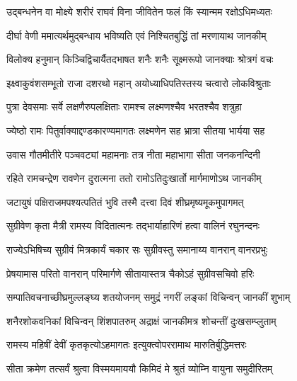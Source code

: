 
\notes{}
\textlink{}
\translink{}

\storymeta


\twolineshloka
{उद्बन्धनेन वा मोक्ष्ये शरीरं राघवं विना}
{जीवितेन फलं किं स्यान्मम रक्षोऽधिमध्यतः} %

\twolineshloka
{दीर्घा वेणी ममात्यर्थमुद्बन्धाय भविष्यति}
{एवं निश्चितबुद्धिं तां मरणायाथ जानकीम्} %

\twolineshloka
{विलोक्य हनुमान् किञ्चिद्विचार्यैतदभाषत}
{शनैः शनैः सूक्ष्मरूपो जानक्याः श्रोत्रगं वचः} %

\twolineshloka
{इक्ष्वाकुवंशसम्भूतो राजा दशरथो महान्}
{अयोध्याधिपतिस्तस्य चत्वारो लोकविश्रुताः} %

\twolineshloka
{पुत्रा देवसमाः सर्वे लक्षणैरुपलक्षिताः}
{रामश्च लक्ष्मणश्चैव भरतश्चैव शत्रुहा} %

\twolineshloka
{ज्येष्ठो रामः पितुर्वाक्याद्दण्डकारण्यमागतः}
{लक्ष्मणेन सह भ्रात्रा सीतया भार्यया सह} %

\twolineshloka
{उवास गौतमीतीरे पञ्चवट्यां महामनाः}
{तत्र नीता महाभागा सीता जनकनन्दिनी} %

\twolineshloka
{रहिते रामचन्द्रेण रावणेन दुरात्मना}
{ततो रामोऽतिदुःखार्तो मार्गमाणोऽथ जानकीम्} %

\twolineshloka
{जटायुषं पक्षिराजमपश्यत्पतितं भुवि}
{तस्मै दत्त्वा दिवं शीघ्रमृष्यमूकमुपागमत्} %

\twolineshloka
{सुग्रीवेण कृता मैत्री रामस्य विदितात्मनः}
{तद्भार्याहारिणं हत्वा वालिनं रघुनन्दनः} %

\twolineshloka
{राज्येऽभिषिच्य सुग्रीवं मित्रकार्यं चकार सः}
{सुग्रीवस्तु समानाय्य वानरान् वानरप्रभुः} %

\twolineshloka
{प्रेषयामास परितो वानरान् परिमार्गणे}
{सीतायास्तत्र चैकोऽहं सुग्रीवसचिवो हरिः} %

\twolineshloka
{सम्पातिवचनाच्छीघ्रमुल्लङ्घ्य शतयोजनम्}
{समुद्रं नगरीं लङ्कां विचिन्वन् जानकीं शुभाम्} %

\twolineshloka
{शनैरशोकवनिकां विचिन्वन् शिंशपातरुम्}
{अद्राक्षं जानकीमत्र शोचन्तीं दुःखसम्प्लुताम्} %

\twolineshloka
{रामस्य महिषीं देवीं कृतकृत्योऽहमागतः}
{इत्युक्त्वोपररामाथ मारुतिर्बुद्धिमत्तरः} %

\twolineshloka
{सीता क्रमेण तत्सर्वं श्रुत्वा विस्मयमाययौ}
{किमिदं मे श्रुतं व्योम्नि वायुना समुदीरितम्} %

